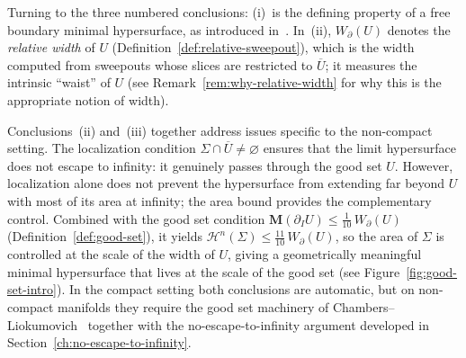 Turning to the three numbered conclusions: (i)~is the defining property of a free boundary minimal hypersurface, as introduced in~\cite{LZ17}. In~(ii), $W_\partial(U)$ denotes the \emph{relative width} of $U$ (Definition~\ref{def:relative-sweepout}), which is the width computed from sweepouts whose slices are restricted to $\overline{U}$; it measures the intrinsic ``waist'' of $U$ (see Remark~\ref{rem:why-relative-width} for why this is the appropriate notion of width).

Conclusions~(ii) and~(iii) together address issues specific to the non-compact setting. The localization condition $\Sigma \cap \overline{U} \neq \varnothing$ ensures that the limit hypersurface does not escape to infinity: it genuinely passes through the good set $U$. However, localization alone does not prevent the hypersurface from extending far beyond $U$ with most of its area at infinity; the area bound provides the complementary control. Combined with the good set condition $\mathbf{M}(\partial_I U) \leq \frac{1}{10}\, W_\partial(U)$ (Definition~\ref{def:good-set}), it yields $\mathcal{H}^n(\Sigma) \leq \frac{11}{10}\, W_\partial(U)$, so the area of $\Sigma$ is controlled at the scale of the width of $U$, giving a geometrically meaningful minimal hypersurface that lives at the scale of the good set (see Figure~\ref{fig:good-set-intro}). In the compact setting both conclusions are automatic, but on non-compact manifolds they require the good set machinery of Chambers--Liokumovich~\cite{CL20} together with the no-escape-to-infinity argument developed in Section~\ref{ch:no-escape-to-infinity}.

